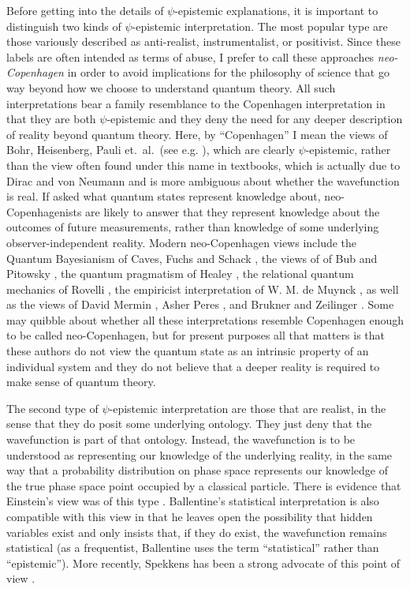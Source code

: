 \documentclass[DIV=calc,fontsize=12pt]{scrartcl} %
\theoremstyle{definition}
\theoremstyle{plain}
\begin{document}
Before getting into the details of $\psi$-epistemic explanations, it
is important to distinguish two kinds of $\psi$-epistemic
interpretation.  The most popular type are those variously described
as anti-realist, instrumentalist, or positivist.  Since these labels
are often intended as terms of abuse, I prefer to call these
approaches \emph{neo-Copenhagen} in order to avoid implications for
the philosophy of science that go way beyond how we choose to
understand quantum theory.  All such interpretations bear a family
resemblance to the Copenhagen interpretation in that they are both
$\psi$-epistemic and they deny the need for any deeper description of
reality beyond quantum theory.  Here, by ``Copenhagen'' I mean the
views of Bohr, Heisenberg, Pauli et.\ al.\ (see e.g. \cite{Faye2008}),
which are clearly $\psi$-epistemic, rather than the view often found
under this name in textbooks, which is actually due to Dirac
\cite{Dirac1958} and von Neumann \cite{Neumann1955} and is more
ambiguous about whether the wavefunction is real.  If asked what
quantum states represent knowledge about, neo-Copenhagenists are
likely to answer that they represent knowledge about the outcomes of
future measurements, rather than knowledge of some underlying
observer-independent reality.  Modern neo-Copenhagen views include the
Quantum Bayesianism of Caves, Fuchs and Schack \cite{Fuchs2010,
Fuchs2010a, Fuchs2013}, the views of of Bub and Pitowsky
\cite{Pitowsky2006}, the quantum pragmatism of Healey
\cite{Healey2012}, the relational quantum mechanics of Rovelli
\cite{Rovelli1996}, the empiricist interpretation of W. M. de Muynck
\cite{Muynck2002}, as well as the views of David Mermin
\cite{Mermin2013}, Asher Peres \cite{Peres1995}, and Brukner and
Zeilinger \cite{Brukner2003}.  Some may quibble about whether all
these interpretations resemble Copenhagen enough to be called
neo-Copenhagen, but for present purposes all that matters is that
these authors do not view the quantum state as an intrinsic property
of an individual system and they do not believe that a deeper reality
is required to make sense of quantum theory.

The second type of $\psi$-epistemic interpretation are those that are
realist, in the sense that they do posit some underlying ontology.
They just deny that the wavefunction is part of that ontology.
Instead, the wavefunction is to be understood as representing our
knowledge of the underlying reality, in the same way that a
probability distribution on phase space represents our knowledge of
the true phase space point occupied by a classical particle.  There is
evidence that Einstein's view was of this type \cite{Harrigan2010}.
Ballentine's statistical interpretation \cite{Ballentine1970} is also
compatible with this view in that he leaves open the possibility that
hidden variables exist and only insists that, if they do exist, the
wavefunction remains statistical (as a frequentist, Ballentine uses
the term ``statistical'' rather than ``epistemic'').  More recently,
Spekkens has been a strong advocate of this point of view
\cite{Spekkens2007}.
\end{document}
